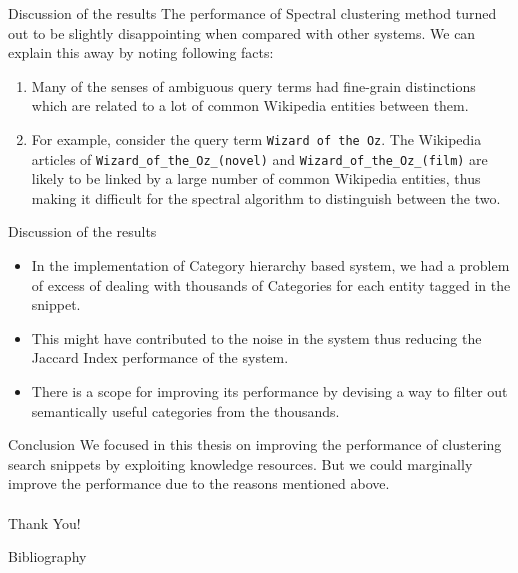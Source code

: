 \documentclass{beamer}
\begin{document}
\begin{frame}[fragile]{Discussion of the results}
The performance of Spectral clustering method turned out to be
slightly disappointing when compared with other systems. We can
explain this away by noting following facts:
    \begin{enumerate}
      \item Many of the senses of ambiguous query terms had fine-grain
        distinctions which are related to a lot of common Wikipedia
        entities between them. 
      \item For example, consider the query term
        \verb|Wizard of the Oz|. The Wikipedia articles of
        \verb|Wizard_of_the_Oz_(novel)| and
        \verb|Wizard_of_the_Oz_(film)| are likely to be linked by a
        large number of common Wikipedia entities, thus making it
        difficult for the spectral algorithm to distinguish between
        the two.
    \end{enumerate}
\end{frame}

\begin{frame}{Discussion of the results}
\begin{itemize}
  \item  In the implementation of Category hierarchy based system, we
    had a problem of excess of dealing with thousands of Categories
    for each entity tagged in the snippet. 
 \item This might have contributed to the noise in the system thus
   reducing the Jaccard Index performance of the system. 
 \item There is a scope for improving its performance by devising a
   way to filter out semantically useful categories from the
   thousands.
\end{itemize}
\end{frame}

\begin{frame}{Conclusion}
We focused in this thesis on improving the performance of
clustering search snippets by exploiting knowledge resources. But we
could marginally improve the performance due to the reasons
mentioned above. \\~\\

\Huge{Thank You!}

\end{frame}


\begin{frame}{Bibliography}
 
 
\end{frame}
\end{document}

